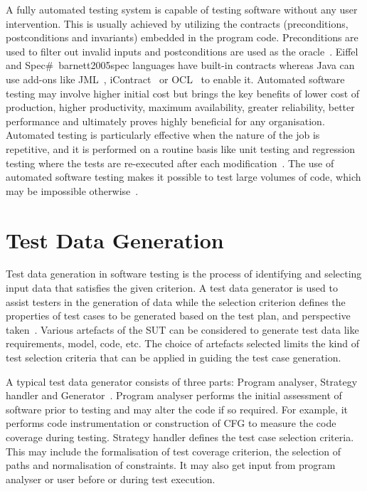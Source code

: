 A fully automated testing system is capable of testing software without any user intervention. This is usually achieved by utilizing the contracts (preconditions, postconditions and invariants) embedded in the program code. Preconditions are used to filter out invalid inputs and postconditions are used as the oracle~\cite{leitner2007reconciling}. Eiffel~\cite{ecma2005367} and Spec\#~{barnett2005spec} languages have built-in contracts whereas Java can use add-ons like JML~\cite{leavensjml}, iContract~\cite{kramer1998icontract} or OCL~\cite{richters1998formalizing} to enable it. 
Automated software testing may involve higher initial cost but brings the key benefits of lower cost of production, higher productivity, maximum availability, greater reliability, better performance and ultimately proves highly beneficial for any organisation. Automated testing is particularly effective when the nature of the job is repetitive, and it is performed on a routine basis like unit testing and regression testing where the tests are re-executed after each modification~\cite{huang2003automated}. The use of automated software testing makes it possible to test large volumes of code, which may be impossible otherwise~\cite{ramamoorthy1975testing}.

\section{Test Data Generation}
Test data generation in software testing is the process of identifying and selecting input data that satisfies the given criterion. A test data generator is used to assist testers in the generation of data while the selection criterion defines the properties of test cases to be generated based on the test plan, and perspective taken~\cite{korel1990automated}. Various artefacts of the SUT can be considered to generate test data like requirements, model, code, etc. The choice of artefacts selected limits the kind of test selection criteria that can be applied in guiding the test case generation. 

A typical test data generator consists of three parts: Program analyser, Strategy handler and Generator~\cite{edvardsson1999survey}. Program analyser performs the initial assessment of software prior to testing and may alter the code if so required. For example, it performs code instrumentation or construction of CFG to measure the code coverage during testing. Strategy handler defines the test case selection criteria. This may include the formalisation of test coverage criterion, the selection of paths and normalisation of constraints. It may also get input from program analyser or user before or during test execution.

